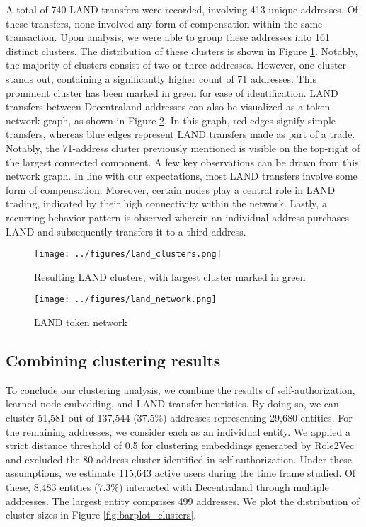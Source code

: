 \documentclass[12pt,a4paper,titlepage,oneside,english]{article}
\begin{document}
A total of 740 LAND transfers were recorded, involving 413 unique addresses. Of these transfers, none involved any form of compensation within the same transaction. Upon analysis, we were able to group these addresses into 161 distinct clusters. The distribution of these clusters is shown in Figure \ref{fig:LAND_clusters}. Notably, the majority of clusters consist of two or three addresses. However, one cluster stands out, containing a significantly higher count of 71 addresses. This prominent cluster has been marked in green for ease of identification. \newline
LAND transfers between Decentraland addresses can also be visualized as a token network graph, as shown in Figure \ref{fig:LAND_network}. In this graph, red edges signify simple transfers, whereas blue edges represent LAND transfers made as part of a trade. Notably, the 71-address cluster previously mentioned is visible on the top-right of the largest connected component. \newline
A few key observations can be drawn from this network graph. In line with our expectations, most LAND transfers involve some form of compensation. Moreover, certain nodes play a central role in LAND trading, indicated by their high connectivity within the network. Lastly, a recurring behavior pattern is observed wherein an individual address purchases LAND and subsequently transfers it to a third address.

\begin{figure}[h!]
	\centering
	\texttt{[image: ../figures/land\_clusters.png]}
	\caption{Resulting LAND clusters, with largest cluster marked in green}
	\label{fig:LAND_clusters}
\end{figure}

\begin{figure}[h!]
	\centering
	\texttt{[image: ../figures/land\_network.png]}
	\caption{LAND token network}
	\label{fig:LAND_network}
\end{figure} 

\subsection{Combining clustering results}
To conclude our clustering analysis, we combine the results of self-authorization, learned node embedding, and LAND transfer heuristics. By doing so, we can cluster 51,581 out of 137,544 (37.5\%) addresses representing 29,680 entities. 
For the remaining addresses, we consider each as an individual entity. 
We applied a strict distance threshold of 0.5 for clustering embeddings generated by Role2Vec and excluded the 80-address cluster identified in self-authorization.
Under these assumptions, we estimate 115,643 active users during the time frame studied. Of these, 8,483 entities (7.3\%) interacted with Decentraland through multiple addresses. The largest entity comprises 499 addresses. We plot the distribution of cluster sizes in Figure \ref{fig:barplot_clusters}.
\end{document}
